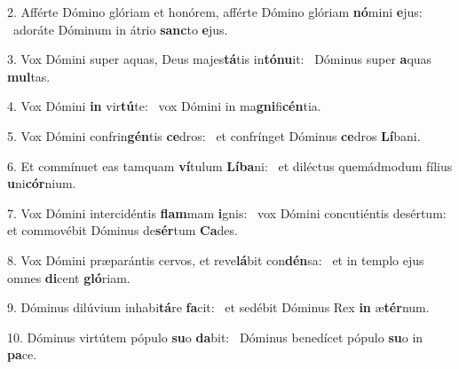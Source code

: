2. Afférte Dómino glóriam et honórem, afférte Dómino glóriam \textbf{nó}mini \textbf{e}jus: \ast\  adoráte Dóminum in átrio \textbf{sanc}to \textbf{e}jus.\

3. Vox Dómini super aquas, Deus majes\textbf{tá}tis in\textbf{tó}\textbf{nu}it: \ast\  Dóminus super \textbf{a}quas \textbf{mul}tas.\

4. Vox Dómini \textbf{in} vir\textbf{tú}te: \ast\  vox Dómini in ma\textbf{gni}fi\textbf{cén}tia.\

5. Vox Dómini confrin\textbf{gén}tis \textbf{ce}dros: \ast\  et confrínget Dóminus \textbf{ce}dros \textbf{Lí}bani.\

6. Et commínuet eas tamquam \textbf{ví}tulum \textbf{Lí}\textbf{ba}ni: \ast\  et diléctus quemádmodum fílius \textbf{u}ni\textbf{cór}nium.\

7. Vox Dómini intercidéntis \textbf{flam}mam \textbf{i}gnis: \ast\  vox Dómini concutiéntis desértum: et commovébit Dóminus de\textbf{sér}tum \textbf{Ca}des.\

8. Vox Dómini præparántis cervos, et reve\textbf{lá}bit con\textbf{dén}sa: \ast\  et in templo ejus omnes \textbf{di}cent \textbf{gló}riam.\

9. Dóminus dilúvium inhabi\textbf{tá}re \textbf{fa}cit: \ast\  et sedébit Dóminus Rex \textbf{in} æ\textbf{tér}num.\

10. Dóminus virtútem pópulo \textbf{su}o \textbf{da}bit: \ast\  Dóminus benedícet pópulo \textbf{su}o in \textbf{pa}ce.\


